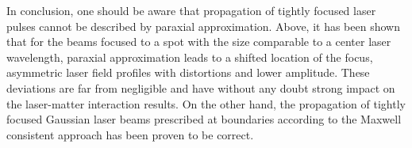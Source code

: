 In conclusion, one should be aware that propagation of tightly focused laser pulses cannot be described by paraxial approximation. Above, it has been shown that for the beams focused to a spot with the size comparable to a center laser wavelength, paraxial approximation leads to a shifted location of the focus, asymmetric laser field profiles with distortions and lower amplitude. These deviations are far from negligible and have without any doubt strong impact on the laser-matter interaction results. On the other hand, the propagation of tightly focused Gaussian laser beams prescribed at boundaries according to the Maxwell consistent approach has been proven to be correct.

\begin{figure}[h!]
	\centering
	\hspace{2mm}
	\\

\end{figure}

